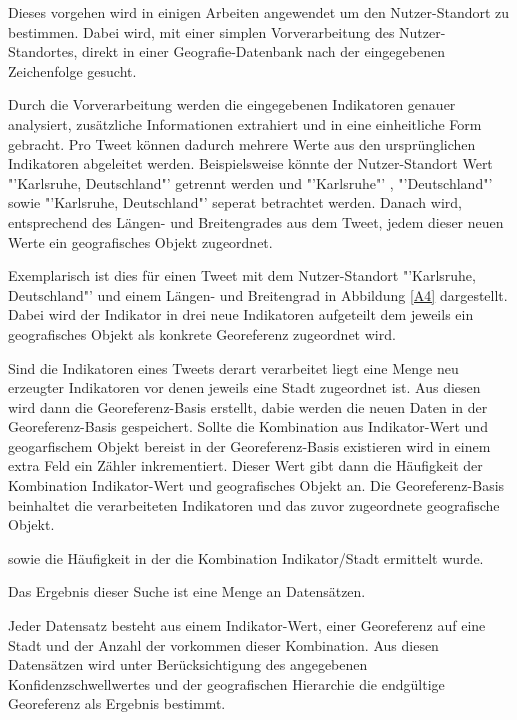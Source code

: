 	
	Dieses vorgehen wird in einigen Arbeiten angewendet um den Nutzer-Standort zu bestimmen. 
	Dabei wird, mit einer simplen Vorverarbeitung des Nutzer-Standortes, direkt in einer Geografie-Datenbank nach der eingegebenen Zeichenfolge gesucht. 

	Durch die Vorverarbeitung werden die eingegebenen Indikatoren genauer analysiert, zusätzliche Informationen extrahiert und in eine einheitliche Form gebracht.
	Pro Tweet können dadurch mehrere Werte aus den ursprünglichen Indikatoren abgeleitet werden.
	Beispielsweise könnte der Nutzer-Standort Wert "'Karlsruhe, Deutschland"' getrennt werden und "'Karlsruhe"' , "'Deutschland"' sowie "'Karlsruhe, Deutschland"' seperat betrachtet werden.  
	Danach wird, entsprechend des Längen- und Breitengrades aus dem Tweet, jedem dieser neuen Werte ein geografisches Objekt zugeordnet.

	Exemplarisch ist dies für einen Tweet mit dem Nutzer-Standort "'Karlsruhe, Deutschland"' und einem Längen- und Breitengrad in Abbildung \ref{A4} dargestellt.
	Dabei wird der Indikator in drei neue Indikatoren aufgeteilt dem jeweils ein geografisches Objekt als konkrete Georeferenz zugeordnet wird.
	
	Sind die Indikatoren eines Tweets derart verarbeitet liegt eine Menge neu erzeugter Indikatoren vor denen jeweils eine Stadt zugeordnet ist.
	Aus diesen wird dann die Georeferenz-Basis erstellt, dabie werden die neuen Daten in der Georeferenz-Basis gespeichert.
	Sollte die Kombination aus Indikator-Wert und geogarfischem Objekt bereist in der Georeferenz-Basis existieren wird in einem extra Feld ein Zähler inkrementiert.
	Dieser Wert gibt dann die Häufigkeit der Kombination Indikator-Wert und geografisches Objekt an. 
	Die Georeferenz-Basis beinhaltet die verarbeiteten Indikatoren und das zuvor zugeordnete geografische Objekt.

	sowie die Häufigkeit in der die Kombination Indikator/Stadt ermittelt wurde.
	

	Das Ergebnis dieser Suche ist eine Menge an Datensätzen.
	
	Jeder Datensatz besteht aus einem Indikator-Wert, einer Georeferenz auf eine Stadt und der Anzahl der vorkommen dieser Kombination.  
	Aus diesen Datensätzen wird unter Berücksichtigung des angegebenen Konfidenzschwellwertes und der geografischen Hierarchie die endgültige Georeferenz als Ergebnis bestimmt.  

